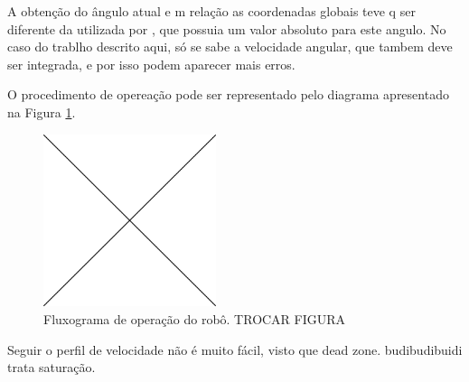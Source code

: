 A obtenção do ângulo atual e m relação as coordenadas globais teve q ser diferente da utilizada por \citet{ritter2016modelagem}, que possuia um valor absoluto para este angulo. No caso do trablho descrito aqui, só se sabe a velocidade angular, que tambem deve ser integrada, e por isso podem aparecer mais erros.

O procedimento de opereação pode ser representado pelo diagrama apresentado na Figura \ref{fig:operation}.


\begin{figure}[h]
  \centering
  \includegraphics[width = 0.45\textwidth]{imagens/edc}
  \caption{Fluxograma de operação do robô. TROCAR FIGURA}
  \label{fig:operation}
\end{figure}



Seguir o perfil de velocidade não é muito fácil, visto que dead zone. budibudibuidi \citet{indiveri2009swedish} trata saturação.

